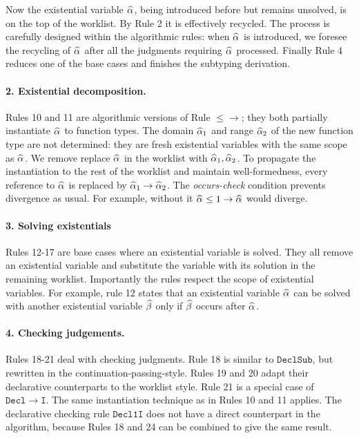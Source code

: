 Now the existential variable $\al$, being introduced before but remains unsolved,
is on the top of the worklist. By Rule 2 it is effectively recycled.
The process is carefully designed within the algorithmic rules:
when $\al$ is introduced,
we foresee the recycling of $\al$ after all the judgments requiring $\al$ processed.
Finally Rule 4 reduces one of the base cases and finishes the subtyping derivation.


\paragraph{\bf 2. Existential decomposition.}
Rules 10 and 11 are algorithmic versions of Rule $\mathtt{{\le}{\to}}$; they
both partially instantiate $\al$ to function types.
The domain $\al[1]$ and range $\al[2]$ of the new function type are not determined:
they are fresh existential variables with the same scope as $\al$.
We remove replace $\al$ in the worklist with  $\al[1], \al[2]$.
To propagate the instantiation to the rest of the worklist and maintain well-formedness,
every reference to $\al$ is replaced by $\al[1] \to \al[2]$.
The \emph{occurs-check} condition prevents divergence as usual.
For example, without it $\al \le 1 \to \al$ would diverge.

\paragraph{\bf 3. Solving existentials} Rules 12-17 are base cases where an existential variable is solved.
They all remove an existential variable and substitute the
variable with its solution in the remaining worklist. Importantly the rules
respect the scope of existential variables. For example, rule 12 
states that an existential variable $\al$ can be solved with another
existential variable $\bt$ only if $\bt$ occurs after $\al$.

\paragraph{\bf 4. Checking judgements.}
Rules 18-21 deal with checking judgments.
Rule 18 is similar to $\mathtt{DeclSub}$, but rewritten in the
continuation-passing-style.
Rules 19 and 20 adapt their declarative counterparts to the worklist style.
Rule 21 is a special case of $\mathtt{Decl\to I}$.
The same instantiation technique as in Rules 10 and 11 applies.
The declarative checking rule $\mathtt{Decl1I}$ does not have a direct counterpart in the algorithm, 
because Rules 18 and 24 can be combined to give the same result.

